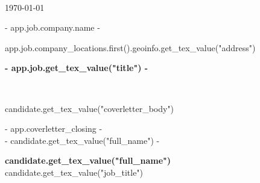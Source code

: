 \documentclass[a4paper, 12pt]{report}
\begin{document}
{%
  \begin{center}
    {\fontsize{24}{0} } \\
    \vspace{5mm}
    \today
  \end{center}

  \vspace{10mm}
  {%
  {{- app.job.company.name -}} \\
  {%
  {{ app.job.company_locations.first().geoinfo.get_tex_value("address") }}
  {%

  \begin{center}
  \textbf{ {{- app.job.get_tex_value("title") -}} }\\
  \vspace{15mm}
  \end{center}

  \\

  \vspace{-3mm}\setlength\parindent{24pt}

  {{ candidate.get_tex_value("coverletter_body") }}

  \vspace{5mm}

  \vspace{10mm}

  \begin{flushleft}
  {{- app.coverletter_closing -}}\\
  {{- candidate.get_tex_value("full_name") -}}\\
  \vspace{3mm}

  \end{flushleft}

  \pagebreak
{%

\begin{center}
  \textbf{\Huge {{ candidate.get_tex_value("full_name") }}} \\
  \vspace{2mm}
   {{ candidate.get_tex_value("job_title") }}
\end{center}

}}}}}
\end{document}
